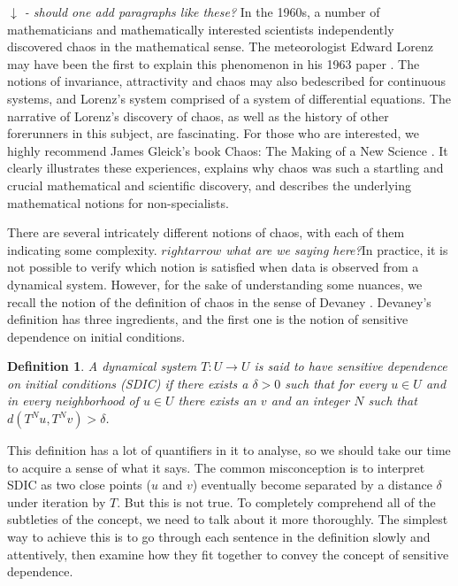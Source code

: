 \documentclass[12 pt]{article}
\newtheorem{Definition}{Definition}[]
\begin{document}
\emph{$\downarrow$ - should one add paragraphs like these?}
\newline In the 1960s, a number of mathematicians and mathematically interested scientists independently discovered chaos in the mathematical sense. The meteorologist Edward Lorenz may have been the first to explain this phenomenon in his 1963 paper \cite{lorenz1963deterministic}. The notions of invariance, attractivity and chaos may also bedescribed for continuous systems, and Lorenz's system comprised of a system of differential equations. The narrative of Lorenz's discovery of chaos, as well as the history of other forerunners in this subject, are fascinating. For those who are interested, we highly recommend James Gleick's book Chaos: The Making of a New Science \cite{gleick2008chaos}. It clearly illustrates these experiences, explains why chaos was such a startling and crucial mathematical and scientific discovery, and describes the underlying mathematical notions for non-specialists.

There are several intricately different notions of chaos, with each of them indicating some complexity. \emph{ $rightarrow$ what are we saying here?}In practice, it is not possible to verify which notion is satisfied when data is observed from a dynamical system. However, for the sake of understanding some nuances, we recall the notion of the definition of chaos in the sense of Devaney \cite{devaney2018introduction,de2013elements}. Devaney's definition has three ingredients, and the first one is the notion of sensitive dependence on initial conditions. 

\begin{Definition} \rm 
A dynamical system $T: U \to U$ is said to have sensitive dependence on initial conditions (SDIC) if there exists a $\delta > 0$ such that for every $u \in U$ and in every neighborhood of $u \in U$ there exists an $v$ and an integer $N$ such that $d(T^Nu,T^Nv)>\delta$. 	
\end{Definition}

This definition has a lot of quantifiers in it to analyse, so we should take our time to acquire a sense of what it says. The common misconception is to interpret SDIC as two close points ($u$ and $v$) eventually become separated by a distance $\delta$ under iteration by $T$. But this is not true. To completely comprehend all of the subtleties of the concept, we need to talk about it more thoroughly. The simplest way to achieve this is to go through each sentence in the definition slowly and attentively, then examine how they fit together to convey the concept of sensitive dependence.
\end{document}
